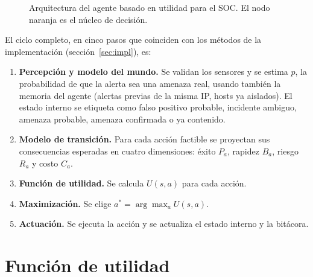 \documentclass[11pt,a4paper]{article}
\begin{document}
\begin{figure}[H]
{}
\caption{Arquitectura del agente basado en utilidad para el SOC. El nodo naranja es el núcleo de decisión.}\label{fig:arq}
\end{figure}

El ciclo completo, en cinco pasos que coinciden con los métodos de la implementación (sección~\ref{sec:impl}), es:
\begin{enumerate}
\item \textbf{Percepción y modelo del mundo.} Se validan los sensores y se estima $p$, la probabilidad de que la alerta sea una amenaza real, usando también la memoria del agente (alertas previas de la misma IP, hosts ya aislados). El estado interno se etiqueta como falso positivo probable, incidente ambiguo, amenaza probable, amenaza confirmada o ya contenido.
\item \textbf{Modelo de transición.} Para cada acción factible se proyectan sus consecuencias esperadas en cuatro dimensiones: éxito $P_a$, rapidez $B_a$, riesgo $R_a$ y costo $C_a$.
\item \textbf{Función de utilidad.} Se calcula $U(s,a)$ para cada acción.
\item \textbf{Maximización.} Se elige $a^*=\arg\max_a U(s,a)$.
\item \textbf{Actuación.} Se ejecuta la acción y se actualiza el estado interno y la bitácora.
\end{enumerate}

\section{Función de utilidad}\label{sec:util}
\end{document}
